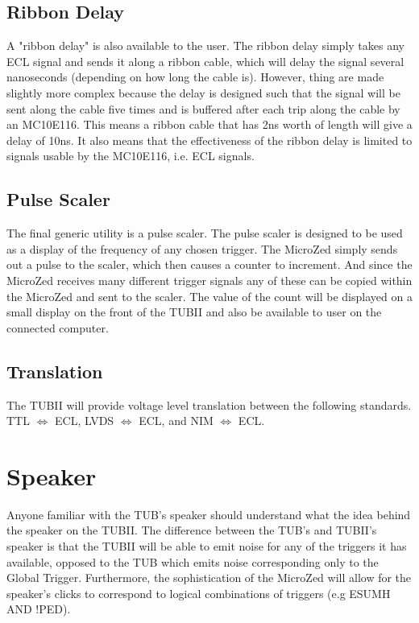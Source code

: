 \documentclass[11pt,a4paper]{article}
\begin{document}
\subsection{Ribbon Delay}
A "ribbon delay" is also available to the user. The ribbon delay simply takes any ECL signal and sends it along a ribbon cable, which will delay the signal several nanoseconds (depending on how long the cable is). However, thing are made slightly more complex because the delay is designed such that the signal will be sent along the cable five times and is buffered after each trip along the cable by an MC10E116. This means a ribbon cable that has 2ns worth of length will give a delay of 10ns. It also means that the effectiveness of the ribbon delay is limited to signals usable by the MC10E116, i.e. ECL signals.

\subsection{Pulse Scaler}
The final generic utility is a pulse scaler. The pulse scaler is designed to be used as a display of the frequency of any chosen trigger. The MicroZed simply sends out a pulse to the scaler, which then causes a counter to increment. And since the MicroZed receives many different trigger signals any of these can be copied within the MicroZed and sent to the scaler. The value of the count will be displayed on a small display on the front of the TUBII and also be available to user on the connected computer.
\subsection{Translation}
The TUBII will provide voltage level translation between the following standards. TTL $\Longleftrightarrow$ ECL, LVDS $\Longleftrightarrow$ ECL, and NIM $\Longleftrightarrow$ ECL.
\section{Speaker}
Anyone familiar with the TUB's speaker should understand what the idea behind the  speaker on the TUBII. The difference between the TUB's and TUBII's speaker is that the TUBII will be able to emit noise for any of the triggers it has available, opposed to the TUB which emits noise corresponding only to the Global Trigger. Furthermore, the sophistication of the MicroZed will allow for the speaker's clicks to correspond to logical combinations of triggers (e.g ESUMH AND !PED).
\end{document}
